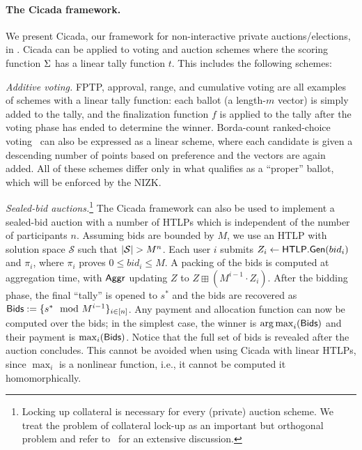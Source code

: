 
\paragraph{The Cicada framework.}
We present Cicada, our framework for non-interactive private auctions/elections, in . Cicada can be applied to voting and auction schemes where the scoring function $\Sigma$ has a linear tally function $t$. 
This includes the following schemes:

\textit{Additive voting.}
FPTP, approval, range, and cumulative voting are all examples of schemes with a linear tally function: each ballot (a length-$m$ vector) is simply added to the tally, and the finalization function $f$ is applied to the tally after the voting phase has ended to determine the winner. Borda-count ranked-choice voting~\cite{Emerson13} can also be expressed as a linear scheme, where each candidate is given a descending number of points based on preference and the vectors are again added. All of these schemes differ only in what qualifies as a ``proper'' ballot, which will be enforced by the NIZK.

\textit{Sealed-bid auctions.}\footnote{Locking up collateral is necessary for every (private) auction scheme. We treat the problem of collateral lock-up as an important but orthogonal problem and refer to~\cite{CCS:TAFWBM23} for an extensive discussion.}
The Cicada framework can also be used to implement a sealed-bid auction with a number of HTLPs which is independent of the number of participants $n$. 
Assuming bids are bounded by $M$, we use an HTLP with solution space $\mathcal{S}$ such that $\lvert \mathcal{S} \rvert > M^n$.
Each user $i$ submits $Z_i \gets \mathsf{HTLP}.{\sf Gen}({bid}_i)$ and $\pi_i$, where $\pi_i$ proves $0 \leq {bid}_i \leq M$. A packing of the bids is computed at aggregation time, with $\mathsf{Aggr}$ updating $Z$ to $Z \boxplus (M^{i-1} \cdot Z_i)$. After the bidding phase, the final ``tally'' is opened to $s^*$ and the bids are recovered as ${\sf Bids} := \{ s^* \mod{M^{i-1}} \}_{i \in [n]}$. Any payment and allocation function can now be computed over the bids; in the simplest case, the winner is $\operatorname*{arg\,max}_i ({\sf Bids})$ and their payment is $\max_i ({\sf Bids})$. Notice that the full set of bids is revealed after the auction concludes. This cannot be avoided when using Cicada with linear HTLPs, since $\max_i$ is a nonlinear function, i.e., it cannot be computed it homomorphically.

